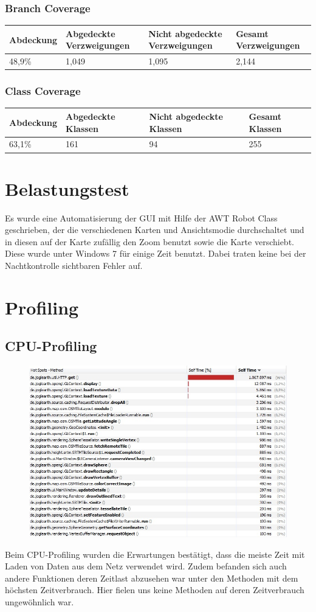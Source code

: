 \documentclass[10pt]{scrreprt}
\begin{document}
\subsection{Branch Coverage}
\begin{longtable}{|l|p{}|p{}|p{}|}
\hline
Abdeckung & Abgedeckte Verzweigungen & Nicht abgedeckte Verzweigungen & Gesamt Verzweigungen \\
\hline
\hline
48,9\% & 1,049 & 1,095 & 2,144 \\
\hline
\end{longtable}
\subsection{Class Coverage}
\begin{longtable}{|l|p{}|p{}|p{}|}
\hline
Abdeckung & Abgedeckte Klassen & Nicht abgedeckte Klassen & Gesamt Klassen \\
\hline
\hline
63,1\% & 161 & 94 & 255 \\
\hline
\end{longtable}
\chapter{Belastungstest}
Es wurde eine Automatisierung der GUI mit Hilfe der AWT Robot Class geschrieben, der die verschiedenen Karten und Ansichtsmodie durchschaltet und in diesen auf der Karte zufällig den Zoom benutzt sowie die Karte verschiebt. 	Diese wurde unter Windows 7 für einige Zeit benutzt. Dabei traten keine bei der Nachtkontrolle sichtbaren Fehler auf.
\chapter{Profiling}
\section{CPU-Profiling}
\begin{figure}[!htb]
\includegraphics[scale=0.8]{cpu_profiling_normal.jpg}
\end{figure}
\vspace{3mm}
Beim CPU-Profiling wurden die Erwartungen bestätigt, dass die meiste Zeit mit Laden von Daten aus dem Netz verwendet wird.
Zudem befanden sich auch andere Funktionen deren Zeitlast abzusehen war unter den Methoden mit dem höchsten Zeitverbrauch. Hier fielen uns keine Methoden auf deren Zeitverbrauch ungewöhnlich war.
\newpage
\end{document}
